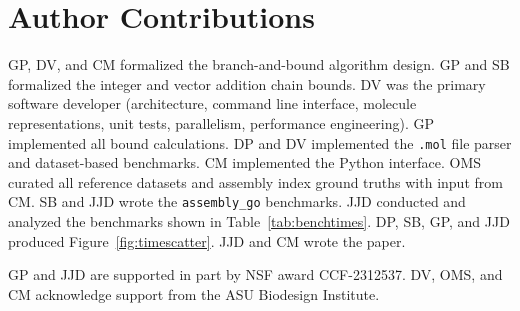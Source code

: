 \documentclass[acmsmall,nonacm,screen]{acmart}  %
\newif\iffigabbrv
\newcommand{\figtext}{\iffigabbrv Fig.\else Figure\fi}
\begin{document}
\section*{Author Contributions}

GP, DV, and CM formalized the branch-and-bound algorithm design.
GP and SB formalized the integer and vector addition chain bounds.
DV was the primary software developer (architecture, command line interface, molecule representations, unit tests, parallelism, performance engineering).
GP implemented all bound calculations.
DP and DV implemented the \texttt{.mol} file parser and dataset-based benchmarks.
CM implemented the Python interface.
OMS curated all reference datasets and assembly index ground truths with input from CM.
SB and JJD wrote the \texttt{assembly\_go} benchmarks.
JJD conducted and analyzed the benchmarks shown in Table~\ref{tab:benchtimes}.
DP, SB, GP, and JJD produced \figtext~\ref{fig:timescatter}.
JJD and CM wrote the paper.




\begin{acks}
    GP and JJD are supported in part by NSF award CCF-2312537.
    DV, OMS, and CM acknowledge support from the ASU Biodesign Institute.
\end{acks}






\end{document}
